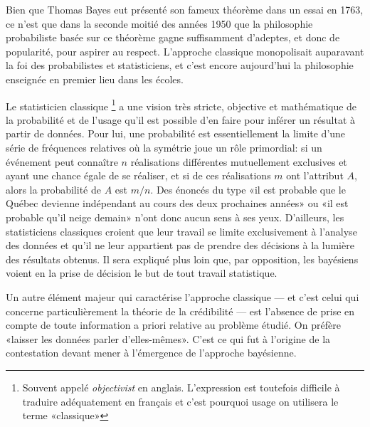 Bien que Thomas Bayes eut présenté son fameux théorème dans un essai
en 1763, ce n'est que dans la seconde moitié des années 1950 que la
philosophie probabiliste basée sur ce théorème gagne suffisamment
d'adeptes, et donc de popularité, pour aspirer au respect. L'approche
classique monopolisait auparavant la foi des probabilistes et
statisticiens, et c'est encore aujourd'hui la philosophie enseignée en
premier lieu dans les écoles.

Le statisticien classique%
\footnote{Souvent appelé \emph{objectivist} en anglais. L'expression
  est toutefois difficile à traduire adéquatement en français et c'est
  pourquoi usage on utilisera le terme «classique»} %
a une vision très stricte, objective et mathématique de la probabilité
et de l'usage qu'il est possible d'en faire pour inférer un résultat à
partir de données. Pour lui, une probabilité est essentiellement la
limite d'une série de fréquences relatives où la symétrie joue un rôle
primordial: si un événement peut connaître $n$ réalisations
différentes mutuellement exclusives et ayant une chance égale de se
réaliser, et si de ces réalisations $m$ ont l'attribut $A$, alors la
probabilité de $A$ est $m/n$. Des énoncés du type «il est probable que
le Québec devienne indépendant au cours des deux prochaines années» ou
«il est probable qu'il neige demain» n'ont donc aucun sens à ses yeux.
D'ailleurs, les statisticiens classiques croient que leur travail se
limite exclusivement à l'analyse des données et qu'il ne leur
appartient pas de prendre des décisions à la lumière des résultats
obtenus. Il sera expliqué plus loin que, par opposition, les bayésiens
voient en la prise de décision le but de tout travail statistique.

Un autre élément majeur qui caractérise l'approche classique --- et
c'est celui qui concerne particulièrement la théorie de la crédibilité
--- est l'absence de prise en compte de toute information a priori
relative au problème étudié. On préfère «laisser les données parler
d'elles-mêmes». C'est ce qui fut à l'origine de la contestation devant
mener à l'émergence de l'approche bayésienne.

